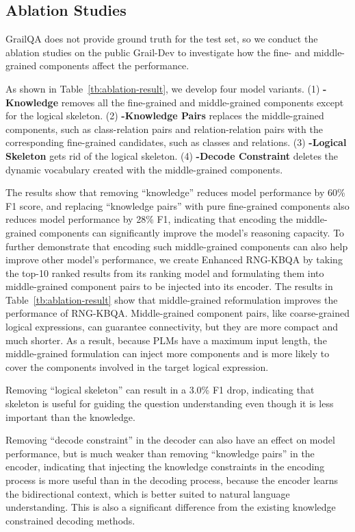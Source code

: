 \subsection{Ablation Studies}
\label{sec:ablation}
GrailQA does not provide ground truth for the test set, so we conduct the ablation studies on the public Grail-Dev to investigate how the fine- and middle-grained components affect the performance.

As shown in Table~\ref{tb:ablation-result}, we develop four model variants. (1) \textbf{-Knowledge} removes all the fine-grained and middle-grained components except for the logical skeleton. (2) \textbf{-Knowledge Pairs} replaces the middle-grained components, such as  class-relation pairs and relation-relation pairs with the corresponding fine-grained candidates, such as classes and relations. (3) \textbf{-Logical Skeleton} gets rid of the logical skeleton. 
(4) \textbf{-Decode Constraint} deletes the dynamic vocabulary created with the middle-grained components. 

The results show that  removing ``knowledge'' reduces model performance by 60\% F1 score, and replacing  ``knowledge pairs'' with pure fine-grained components also reduces model performance by 28\% F1, indicating that encoding the middle-grained components can significantly improve the model's reasoning capacity. To further demonstrate that encoding such middle-grained components can also help improve other model's performance, we create Enhanced RNG-KBQA by taking the top-10 ranked results from its ranking model and formulating them into middle-grained component pairs to be injected into its encoder. The results in Table~\ref{tb:ablation-result} show that middle-grained reformulation improves the performance of RNG-KBQA.
Middle-grained component pairs, like coarse-grained logical expressions, can guarantee connectivity, but they are more compact and much shorter.
As a result, because PLMs have a maximum input length, the middle-grained formulation can inject more components and is more likely to cover the components involved in the target logical expression.

Removing ``logical skeleton'' can result in a 3.0\% F1 drop, indicating that skeleton is useful for guiding the question understanding even though it is less important than the knowledge.

Removing ``decode constraint'' in the decoder can also have an effect on model performance, but is much weaker than removing ``knowledge pairs'' in the encoder, indicating that injecting the knowledge constraints in the encoding process is more useful than in the decoding process, because the encoder learns the bidirectional context, which is better suited to natural language understanding. This is also a significant difference from the existing knowledge constrained decoding methods.

